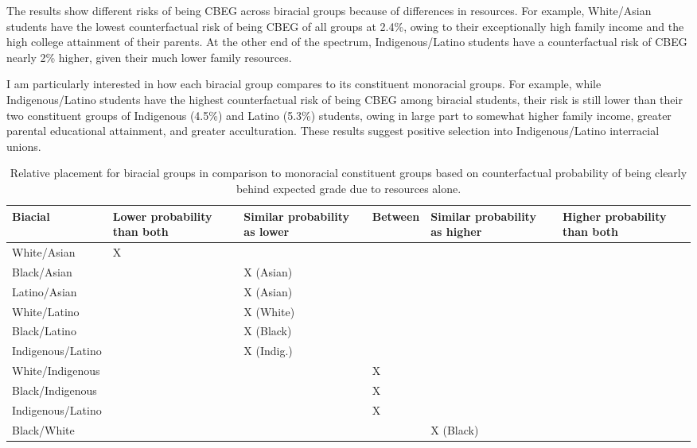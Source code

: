 \documentclass[
  12pt,
  letterpaper,
]{article}
\begin{document}
The results show different risks of being CBEG across biracial groups
because of differences in resources. For example, White/Asian students
have the lowest counterfactual risk of being CBEG of all groups at
2.4\%, owing to their exceptionally high family income and the high
college attainment of their parents. At the other end of the spectrum,
Indigenous/Latino students have a counterfactual risk of CBEG nearly 2\%
higher, given their much lower family resources.

I am particularly interested in how each biracial group compares to its
constituent monoracial groups. For example, while Indigenous/Latino
students have the highest counterfactual risk of being CBEG among
biracial students, their risk is still lower than their two constituent
groups of Indigenous (4.5\%) and Latino (5.3\%) students, owing in large
part to somewhat higher family income, greater parental educational
attainment, and greater acculturation. These results suggest positive
selection into Indigenous/Latino interracial unions.

\hypertarget{tbl-resource-summary}{}
\begin{table}
\caption{\label{tbl-resource-summary}Relative placement for biracial groups in comparison to monoracial
constituent groups based on counterfactual probability of being clearly
behind expected grade due to resources alone. }\tabularnewline

\centering
\begin{tabular}[t]{>{\raggedright\arraybackslash}p{2cm}>{\raggedleft\arraybackslash}p{2cm}>{\raggedleft\arraybackslash}p{2cm}>{\raggedleft\arraybackslash}p{2cm}>{\raggedleft\arraybackslash}p{2cm}>{\raggedleft\arraybackslash}p{2cm}}
\toprule
Biacial & Lower probability than both & Similar probability as lower & Between & Similar probability as higher & Higher probability than both\\
\midrule
White/Asian & X &  &  &  & \\
Black/Asian &  & X (Asian) &  &  & \\
Latino/Asian &  & X (Asian) &  &  & \\
White/Latino &  & X (White) &  &  & \\
Black/Latino &  & X (Black) &  &  & \\
Indigenous/Latino &  & X (Indig.) &  &  & \\
White/Indigenous &  &  & X &  & \\
Black/Indigenous &  &  & X &  & \\
Indigenous/Latino &  &  & X &  & \\
Black/White &  &  &  & X (Black) & \\
\bottomrule
\end{tabular}
\end{table}
\end{document}

